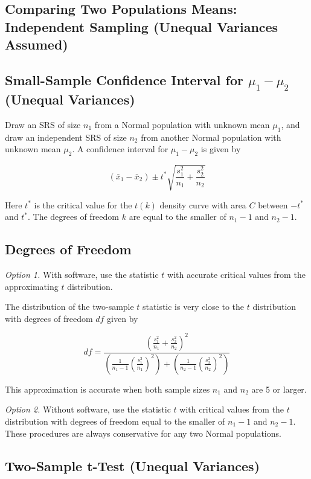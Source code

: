 \subsection{Comparing Two Populations Means: Independent Sampling (Unequal Variances Assumed)}
\subsection*{Small-Sample Confidence Interval for $\mu_1 - \mu_2$ (Unequal Variances)}

Draw an SRS of size $n_1$ from a Normal population with unknown mean $\mu_1$, and draw an independent SRS of size $n_2$ from another Normal population with unknown mean $\mu_2$. A confidence interval for $\mu_1 - \mu_2$ is given by

\[
(\bar{x}_1 - \bar{x}_2) \pm t^* \sqrt{\frac{s_1^2}{n_1} + \frac{s_2^2}{n_2}}
\]

Here $t^*$ is the critical value for the $t(k)$ density curve with area $C$ between $-t^*$ and $t^*$. The degrees of freedom $k$ are equal to the smaller of $n_1 - 1$ and $n_2 - 1$.
\subsection*{Degrees of Freedom}

\textit{Option 1.} With software, use the statistic $t$ with accurate critical values from the approximating $t$ distribution.

The distribution of the two-sample $t$ statistic is very close to the $t$ distribution with degrees of freedom $df$ given by

\[
df = \frac{\left( \frac{s_1^2}{n_1} + \frac{s_2^2}{n_2} \right)^2}
{
\left( \frac{1}{n_1 - 1} \left( \frac{s_1^2}{n_1} \right)^2 \right)
+
\left( \frac{1}{n_2 - 1} \left( \frac{s_2^2}{n_2} \right)^2 \right)
}
\]

This approximation is accurate when both sample sizes $n_1$ and $n_2$ are 5 or larger.
\vspace{0.5em}

\textit{Option 2.} Without software, use the statistic $t$ with critical values from the $t$ distribution with degrees of freedom equal to the smaller of $n_1 - 1$ and $n_2 - 1$. These procedures are always conservative for any two Normal populations.
\subsection*{Two-Sample t-Test (Unequal Variances)}

